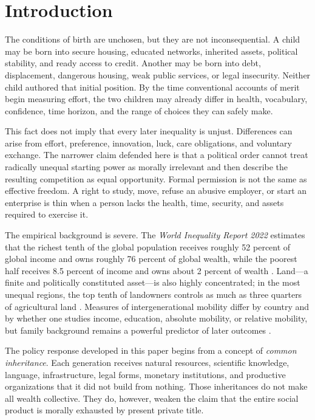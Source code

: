 \documentclass[11pt]{article}
\begin{document}
\section{Introduction}

The conditions of birth are unchosen, but they are not inconsequential. A child may be
born into secure housing, educated networks, inherited assets, political stability,
and ready access to credit. Another may be born into debt, displacement, dangerous
housing, weak public services, or legal insecurity. Neither child authored that initial
position. By the time conventional accounts of merit begin measuring effort, the two
children may already differ in health, vocabulary, confidence, time horizon, and the
range of choices they can safely make.

This fact does not imply that every later inequality is unjust. Differences can arise
from effort, preference, innovation, luck, care obligations, and voluntary exchange.
The narrower claim defended here is that a political order cannot treat radically
unequal starting power as morally irrelevant and then describe the resulting
competition as equal opportunity. Formal permission is not the same as effective
freedom. A right to study, move, refuse an abusive employer, or start an enterprise is
thin when a person lacks the health, time, security, and assets required to exercise it.

The empirical background is severe. The \emph{World Inequality Report 2022} estimates
that the richest tenth of the global population receives roughly 52 percent of global
income and owns roughly 76 percent of global wealth, while the poorest half receives
8.5 percent of income and owns about 2 percent of wealth \cite{wir2022}. Land---a
finite and politically constituted asset---is also highly concentrated; in the most
unequal regions, the top tenth of landowners controls as much as three quarters of
agricultural land \cite{bauluz2020}. Measures of intergenerational mobility differ by
country and by whether one studies income, education, absolute mobility, or relative
mobility, but family background remains a powerful predictor of later outcomes
\cite{vanderweide2024}.

The policy response developed in this paper begins from a concept of \emph{common
inheritance}. Each generation receives natural resources, scientific knowledge,
language, infrastructure, legal forms, monetary institutions, and productive
organizations that it did not build from nothing. Those inheritances do not make all
wealth collective. They do, however, weaken the claim that the entire social product is
morally exhausted by present private title.
\end{document}
